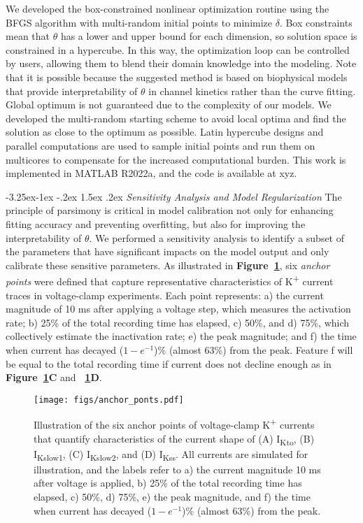 \documentclass[11pt]{article}
\makeatletter
\renewcommand\subsection{\@startsection{subsection}{2}{\z@}%
                                     {-3.25ex\@plus -1ex \@minus -.2ex}%
                                     {1.5ex \@plus .2ex}%
                                     {\normalfont\fontfamily{phv}\fontsize{14}{17}\bfseries}}
\makeatother
\begin{document}
We developed the box-constrained nonlinear optimization routine using the BFGS algorithm with multi-random initial points to minimize $\delta$. Box constraints mean that $\theta$ has a lower and upper bound for each dimension, so solution space is constrained in a hypercube. In this way, the optimization loop can be controlled by users, allowing them to blend their domain knowledge into the modeling. Note that it is possible because the suggested method is based on biophysical models that provide interpretability of $\theta$ in channel kinetics rather than the curve fitting. Global optimum is not guaranteed due to the complexity of our models. We developed the multi-random starting scheme to avoid local optima and find the solution as close to the optimum as possible. Latin hypercube designs and parallel computations are used to sample initial points and run them on multicores to compensate for the increased computational burden. This work is implemented in MATLAB R2022a, and the code is available at xyz.

\subsection{\emph{Sensitivity Analysis and Model Regularization}} \label{s:methods.3}
The principle of parsimony is critical in model calibration not only for enhancing fitting accuracy and preventing overfitting, but also for improving the interpretability of $\theta$. We performed a sensitivity analysis to identify a subset of the parameters that have significant impacts on the model output and only calibrate these sensitive parameters. As illustrated in \textbf{Figure~\ref{fig:anchor_points}}, six \textit{anchor points} were defined that capture representative characteristics of K\textsuperscript{+} current traces in voltage-clamp experiments. Each point represents: a) the current magnitude of 10 ms after applying a voltage step, which measures the activation rate; b) 25\% of the total recording time has elapsed, c) 50\%, and d) 75\%, which collectively estimate the inactivation rate; e) the peak magnitude; and f) the time when current has decayed ($1-e^{-1}$)\% (almost 63\%) from the peak. Feature f will be equal to the total recording time if current does not decline enough as in \textbf{Figure~\ref{fig:anchor_points}C} and \textbf{~\ref{fig:anchor_points}D}. 
\begin{figure}[!ht]
    \centering
    \texttt{[image: figs/anchor\_ponts.pdf]}
    \caption{Illustration of the six anchor points of voltage-clamp K\textsuperscript{+} currents that quantify characteristics of the current shape of (A) I\textsubscript{Kto}, (B) I\textsubscript{Kslow1}, (C) I\textsubscript{Kslow2}, and (D) I\textsubscript{Kss}. All currents are simulated for illustration, and the labels refer to a) the current magnitude 10 ms after voltage is applied, b) 25\% of the total recording time has elapsed, c) 50\%, d) 75\%, e) the peak magnitude, and f) the time when current has decayed ($1-e^{-1}$)\% (almost 63\%) from the peak.}
    \label{fig:anchor_points}
\end{figure}
\end{document}
